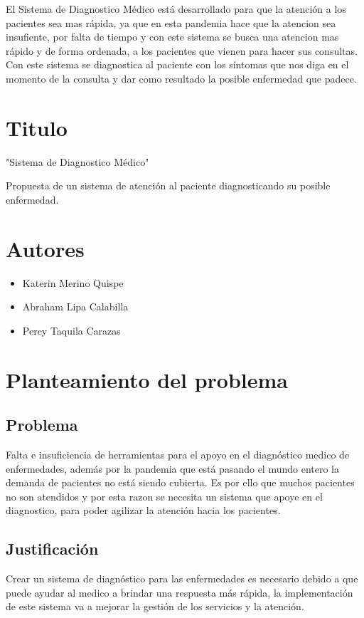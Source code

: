 \documentclass[preprint,12pt,notitlepage]{elsarticle}
\begin{document}
El Sistema de Diagnostico Médico está desarrollado para que la atención a los pacientes sea mas rápida, ya que en esta pandemia hace que la atencion sea insufiente, por falta de tiempo y con este sistema se busca una atencion mas rápido y de forma ordenada, a los pacientes que vienen para hacer sus consultas. Con este sistema se diagnostica al paciente con los síntomas que nos diga en el momento de la consulta y dar como resultado la posible enfermedad que padece.

\section{Titulo}
"Sistema de Diagnostico Médico"

Propuesta de un sistema de atención al paciente diagnosticando su posible enfermedad.
\section{Autores}
\begin{itemize}
    \item Katerin Merino Quispe
    \item Abraham Lipa Calabilla
    \item Percy Taquila Carazas
    
\end{itemize}
\section{Planteamiento del problema}
	\subsection{\textbf{Problema}}
Falta e insuficiencia de herramientas para el apoyo en el diagnóstico medico de enfermedades, además por la pandemia que está pasando el mundo entero la demanda de pacientes no está siendo cubierta. Es por ello que muchos pacientes no son atendidos y por esta razon se necesita un sistema que apoye en el diagnostico, para poder agilizar la atención hacia los pacientes.
	\subsection{\textbf{Justificación }}
Crear un sistema de diagnóstico para las enfermedades es necesario debido a que puede ayudar al medico a brindar una respuesta más rápida, la implementación de este sistema va a mejorar la gestión de los servicios y la atención.
\end{document}
